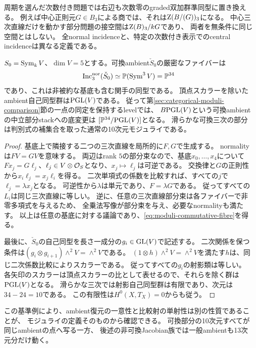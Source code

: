 周期を選んだ次数付き問題では右辺も次数零のgraded双加群準同型に置き換える。
例えば中心正則元$G\in B_3$による商では、それは$\operatorname{Z}(B/(G))_3$になる。
中心三次直線だけを動かす部分問題の接空間は$\operatorname{Z}(B)_3/kG$であり、
両者を無条件に同じ空間とはしない。
全normal incidenceと、特定の次数付き表示でのcentral incidenceは異なる定義である。

\begin{proposition}[可換ambientのファイバー]
\label{prop:moduli-commutative-fibre}
$S_0=\operatorname{Sym}_k V$、$\dim V=5$とする。可換ambient$\check S_0$の厳密なファイバーは
\begin{equation}\label{eq:moduli-commutative-fibre}
 \operatorname{Inc}^{\rm nor}_3(\check S_0)
       \simeq\mathbb P(\operatorname{Sym}^3 V)=\mathbb P^{34}
\end{equation}
であり、これは非被約な基底も含む関手の同型である。
頂点スカラーを除いたambient自己同型群は$\mathrm{PGL}(V)$である。
従って第\ref{sec:categorical-moduli-comparison}節の一点の同定を保持するlevelでは、
$B\mathrm{PGL}(V)$という可換ambientの中立部分stackへの底変更は
$[\mathbb P^{34}/\mathrm{PGL}(V)]$となる。
滑らかな可換三次の部分は判別式の補集合を取った通常の10次元モジュライである。
\end{proposition}
\begin{proof}
基底上で隣接する二つの三次直線を局所的に$F,G$で生成する。
normalityは$F V=G V$を意味する。
両辺はrank $5$の部分束なので、基底$x_0,\ldots,x_4$について
$F x_j=G\ell_j$、$\ell_j\in V\otimes\mathcal O_S$となり、$x_j\mapsto\ell_j$は可逆である。
交換律と$G$の正則性から$x_i\ell_j=x_j\ell_i$を得る。
二次単項式の係数を比較すれば、すべての$j$で$\ell_j=\lambda x_j$となる。
可逆性から$\lambda$は単元であり、$F=\lambda G$である。
従ってすべての$L_i$は同じ三次直線に等しい。
逆に、任意の三次直線部分束は各ファイバーで非零多項式を与えるため、
全乗法写像が部分束を与え、必要なnormalityも満たす。
以上は任意の基底に対する議論であり、\eqref{eq:moduli-commutative-fibre}を得る。

最後に、$\check S_0$の自己同型を長さ一成分の$g_i\in\mathrm{GL}(V)$で記述する。
二次関係を保つ条件は$(g_i\otimes g_{i+1})\wedge^2 V=\wedge^2 V$である。
$(1\otimes h)\wedge^2 V=\wedge^2 V$を満たす$h$は、同じ二次係数比較によりスカラーである。
従ってすべての$g_i$の射影類は等しい。
各矢印のスカラーは頂点スカラーの比として表せるので、それらを除く群は$\mathrm{PGL}(V)$となる。
滑らかな三次では射影自己同型群は有限であり、次元は$34-24=10$である。
この有限性は$H^0(X,T_X)=0$からも従う。
\end{proof}

この基準例により、ambient復元の一意性と比較射の単射性は別の性質であることが、
モジュライの定義そのものから確認できる。
可換部分の10次元すべてが同じambientの点へ写る一方、
後述の非可換Jacobian族では一般ambientも13次元分だけ動く。
